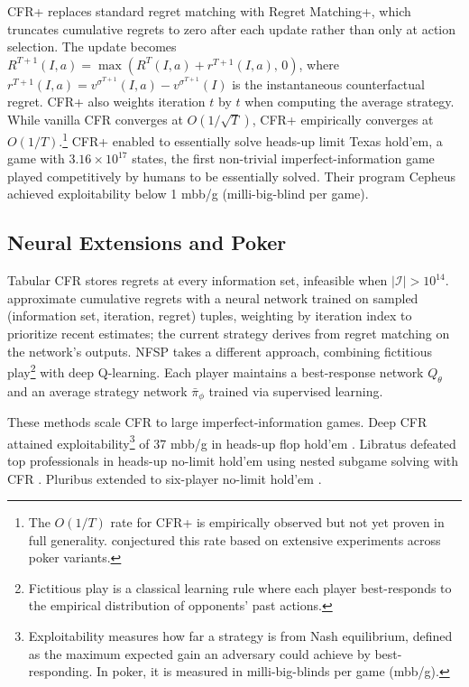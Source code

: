 CFR+ \citep{tammelin2014solving} replaces standard regret matching with Regret Matching+, which truncates cumulative regrets to zero after each update rather than only at action selection. The update becomes $R^{T+1}(I, a) = \max(R^T(I, a) + r^{T+1}(I, a),\, 0)$, where $r^{T+1}(I,a) = v^{\sigma^{T+1}}(I,a) - v^{\sigma^{T+1}}(I)$ is the instantaneous counterfactual regret. CFR+ also weights iteration $t$ by $t$ when computing the average strategy. While vanilla CFR converges at $O(1/\sqrt{T})$, CFR+ empirically converges at $O(1/T)$.\footnote{The $O(1/T)$ rate for CFR+ is empirically observed but not yet proven in full generality. \citet{tammelin2014solving} conjectured this rate based on extensive experiments across poker variants.} CFR+ enabled \citet{bowling2015heads} to essentially solve heads-up limit Texas hold'em, a game with $3.16 \times 10^{17}$ states, the first non-trivial imperfect-information game played competitively by humans to be essentially solved. Their program Cepheus achieved exploitability below 1 mbb/g (milli-big-blind per game).

\subsection{Neural Extensions and Poker}

Tabular CFR stores regrets at every information set, infeasible when $|\mathcal{I}| > 10^{14}$. \citet{Brown2019} approximate cumulative regrets with a neural network trained on sampled (information set, iteration, regret) tuples, weighting by iteration index to prioritize recent estimates; the current strategy derives from regret matching on the network's outputs. NFSP \citep{heinrich2016deep} takes a different approach, combining fictitious play\footnote{Fictitious play \citep{Brown1951} is a classical learning rule where each player best-responds to the empirical distribution of opponents' past actions.} with deep Q-learning. Each player maintains a best-response network $Q_\theta$ and an average strategy network $\bar{\pi}_\phi$ trained via supervised learning.

These methods scale CFR to large imperfect-information games. Deep CFR attained exploitability\footnote{Exploitability measures how far a strategy is from Nash equilibrium, defined as the maximum expected gain an adversary could achieve by best-responding. In poker, it is measured in milli-big-blinds per game (mbb/g).} of 37 mbb/g in heads-up flop hold'em \citep{Brown2019}. Libratus defeated top professionals in heads-up no-limit hold'em using nested subgame solving with CFR \citep{brown2017superhuman}. Pluribus extended to six-player no-limit hold'em \citep{brown2019superhuman}.


